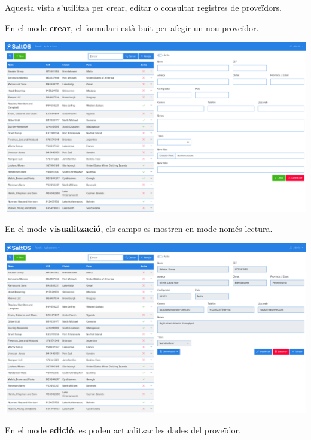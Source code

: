 \documentclass[a4paper]{article}
\begin{document}
Aquesta vista s'utilitza per crear, editar o consultar registres de proveïdors.

En el mode \textbf{crear}, el formulari està buit per afegir un nou proveïdor.

\begin{center}\includegraphics[width=1\textwidth]{../ujest/snaps/test-screenshots-js-screenshots-purchases-suppliers-create-ca-es-1-snap.png}\end{center}

En el mode \textbf{visualització}, els camps es mostren en mode només lectura.

\begin{center}\includegraphics[width=1\textwidth]{../ujest/snaps/test-screenshots-js-screenshots-purchases-suppliers-view-100-ca-es-1-snap.png}\end{center}

En el mode \textbf{edició}, es poden actualitzar les dades del proveïdor.
\end{document}
